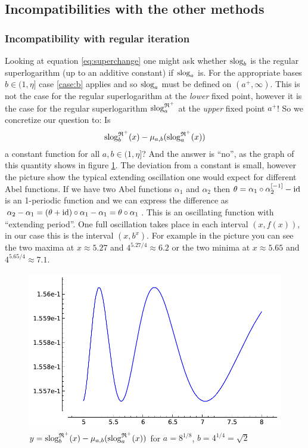 \documentclass{article}
\numberwithin{equation}{section}
\begin{document}
\subsection{Incompatibilities with the other methods}

\subsubsection{Incompatibility with regular iteration}
Looking at equation \eqref{eq:superchange} one might ask whether
$\operatorname{slog}_b$ is the regular superlogarithm (up to an additive constant) if $\operatorname{slog}_a$ is.
For the appropriate bases $b\in(1,\eta]$ case \ref{case:b} applies and so $\operatorname{slog}_a$
must be defined on $(a^+,\infty)$. This is
not the case for the regular superlogarithm at the {\em lower} fixed point,
however it is the case for the regular superlogarithm $\operatorname{slog}^{\mathfrak{R}^+}_a$ at
the {\em upper} fixed point $a^+$! So we concretize our question to:
Is \begin{align*}\operatorname{slog}^{\mathfrak{R}^+}_b(x) - \mu_{a,b}(\operatorname{slog}^{\mathfrak{R}^+}_a(x))\end{align*} a constant function for all $a,b\in
(1,\eta]$? And the answer is ``no'', as the graph of this
quantity shows in figure \ref{fig:muregdiff}. The deviation from a
constant is small, however the picture show the typical extending
oscillation one would expect for different Abel functions. If we have
two Abel functions $\alpha_1$ and $\alpha_2$ then
$\theta=\alpha_1\circ \alpha_2^{[-1]}-\operatorname{id}$ is an 1-periodic function and we can
express the difference as
$\alpha_2-\alpha_1=(\theta+\operatorname{id})\circ\alpha_1-\alpha_1=\theta\circ\alpha_1$. This
is an oscillating function with ``extending period''. One full
oscillation takes place in each interval $(x,f(x))$, in
our case this is the interval $(x,b^x)$. For example in the picture
you can see the two maxima at $x\approx 5.27$ and $4^{5.27/4}\approx
6.2$ or the two minima at $x\approx 5.65$ and $4^{5.65/4}\approx 7.1$.
\begin{figure}
\begin{center}
\includegraphics{muregdiff-4-8}
\end{center}
\caption{$y=\operatorname{slog}^{\mathfrak{R}^+}_b(x) - \mu_{a,b}(\operatorname{slog}^{\mathfrak{R}^+}_a(x))$ for $a=8^{1/8}$,
  $b=4^{1/4}=\sqrt{2}$ }
\label{fig:muregdiff}
\end{figure}
\end{document}
